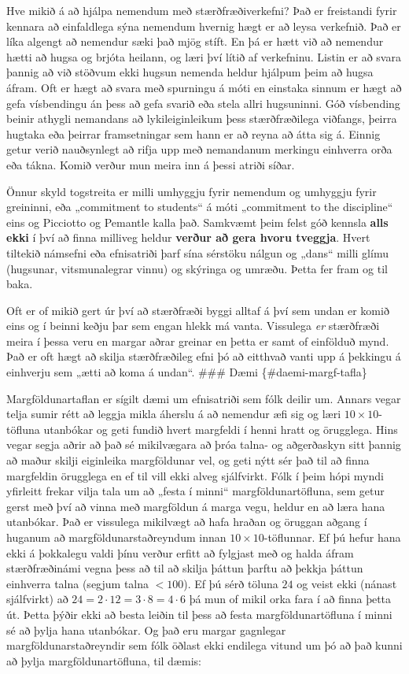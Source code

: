 \documentclass[
  icelandic,
]{book}
\begin{document}
Hve mikið á að hjálpa nemendum með stærðfræðiverkefni? Það er freistandi fyrir kennara að einfaldlega sýna nemendum hvernig hægt er að leysa verkefnið. Það er líka algengt að nemendur sæki það mjög stíft. En þá er hætt við að nemendur hætti að hugsa og brjóta heilann, og læri því lítið af verkefninu. Listin er að svara þannig að við stöðvum ekki hugsun nemenda heldur hjálpum þeim að hugsa áfram. Oft er hægt að svara með spurningu á móti en einstaka sinnum er hægt að gefa vísbendingu án þess að gefa svarið eða stela allri hugsuninni. Góð vísbending beinir athygli nemandans að lykileiginleikum þess stærðfræðilega viðfangs, þeirra hugtaka eða þeirrar framsetningar sem hann er að reyna að átta sig á. Einnig getur verið nauðsynlegt að rifja upp með nemandanum merkingu einhverra orða eða tákna. Komið verður mun meira inn á þessi atriði síðar.

Önnur skyld togstreita er milli umhyggju fyrir nemendum og umhyggju fyrir greininni, eða „commitment to students`` á móti „commitment to the discipline`` eins og Picciotto og Pemantle kalla það. Samkvæmt þeim felst góð kennsla \textbf{alls ekki} í því að finna milliveg heldur \textbf{verður að gera hvoru tveggja}. Hvert tiltekið námsefni eða efnisatriði þarf sína sérstöku nálgun og „dans`` milli glímu (hugsunar, vitsmunalegrar vinnu) og skýringa og umræðu. Þetta fer fram og til baka.

Oft er of mikið gert úr því að stærðfræði byggi alltaf á því sem undan er komið eins og í beinni keðju þar sem engan hlekk má vanta. Vissulega \emph{er} stærðfræði meira í þessa veru en margar aðrar greinar en þetta er samt of einfölduð mynd. Það er oft hægt að skilja stærðfræðileg efni þó að eitthvað vanti upp á þekkingu á einhverju sem „ætti að koma á undan``.
\#\#\# Dæmi \{\#daemi-margf-tafla\}

Margföldunartaflan er sígilt dæmi um efnisatriði sem fólk deilir um. Annars vegar telja sumir rétt að leggja mikla áherslu á að nemendur æfi sig og læri \(10 \times  10\)-töfluna utanbókar og geti fundið hvert margfeldi í henni hratt og örugglega. Hins vegar segja aðrir að það sé mikilvægara að þróa talna- og aðgerðaskyn sitt þannig að maður skilji eiginleika margföldunar vel, og geti nýtt sér það til að finna margfeldin örugglega en ef til vill ekki alveg sjálfvirkt. Fólk í þeim hópi myndi yfirleitt frekar vilja tala um að „festa í minni`` margföldunartöfluna, sem getur gerst með því að vinna með margföldun á marga vegu, heldur en að læra hana utanbókar. Það er vissulega mikilvægt að hafa hraðan og öruggan aðgang í huganum að margföldunarstaðreyndum innan \(10  \times 10\)-töflunnar. Ef þú hefur hana ekki á þokkalegu valdi þínu verður erfitt að fylgjast með og halda áfram stærðfræðinámi vegna þess að til að skilja þáttun þarftu að þekkja þáttun einhverra talna (segjum talna \(<100\)). Ef þú sérð töluna \(24\) og veist ekki (nánast sjálfvirkt) að \(24 = 2 \cdot 12 = 3 \cdot 8 = 4 \cdot 6\) þá mun of mikil orka fara í að finna þetta út. Þetta þýðir ekki að besta leiðin til þess að festa margföldunartöfluna í minni sé að þylja hana utanbókar. Og það eru margar gagnlegar margföldunarstaðreyndir sem fólk öðlast ekki endilega vitund um þó að það kunni að þylja margföldunartöfluna, til dæmis:
\end{document}
